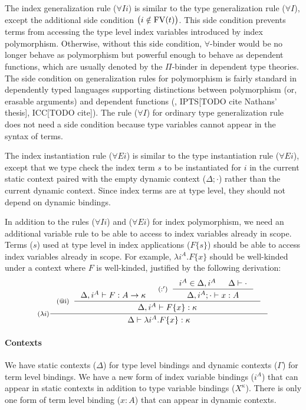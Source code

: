 The index generalization rule ($\forall I i$) is similar to
the type generalization rule ($\forall I$), except the additional
side condition $\big(i\notin\mathop{\mathrm{FV}}(t)\big)$. This side condition prevents
terms from accessing the type level index variables introduced by index
polymorphism. Otherwise, without this side condition, $\forall$-binder
would be no longer behave as polymorphism but powerful enough to behave as
dependent functions, which are usually denoted by the $\Pi$-binder in
dependent type theories. The side condition on generalization rules
for polymorphism is fairly standard in dependently typed languages supporting
distinctions between polymorphism (or, erasable arguments) and
dependent functions (\eg, IPTS[TODO cite Nathans' thesis], ICC[TODO cite]).
The rule ($\forall I$) for ordinary type generalization rule does not need
a side condition because type variables cannot appear in the syntax of terms.

The index instantiation rule ($\forall E i$) is similar to
the type instantiation rule ($\forall E i$), except that
we type check the index term $s$ to be instantiated for $i$
in the current static context paired with the empty dynamic context
($\Delta;\cdot$) rather than the current dynamic context.
Since index terms are at type level, they should not depend on dynamic bindings.

In addition to the rules ($\forall I i$) and ($\forall E i$) for
index polymorphism, we need an additional variable rule 
to be able to access to index variables already in scope. Terms ($s$) used
at type level in index applications ($F\{s\}$) should be able to access
index variables already in scope. For example, $\lambda i^A.F\{x\}$ should be
well-kinded under a context where $F$ is well-kinded,
justified by the following derivation:
\[ \inference[($\lambda i$)]
      { \inference[(@i)]{ \Delta, i^A |- F : A -> \kappa
                        & \inference[($:'$)]{ i^A\in \Delta,i^A
                                            & \Delta |- \cdot }
                                            {\Delta,i^A;\cdot |- x:A}
                        }
                        {\Delta, i^A |- F\{x\} : \kappa} }
      {\Delta |- \lambda i^A.F\{x\} :\kappa}
\]

\paragraph{Contexts}
We have static contexts ($\Delta$) for type level bindings
and dynamic contexts ($\Gamma$) for term level bindings.
We have a new form of index variable bindings ($i^A$) that can appear in
static contexts in addition to type variable bindings ($X^\kappa$).
There is only one form of term level binding ($x:A$) that can appear in
dynamic contexts.

